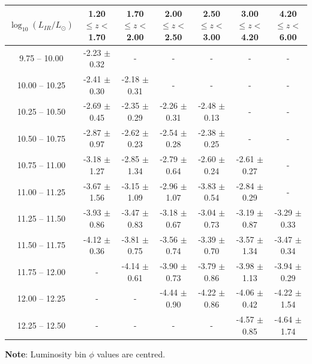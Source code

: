 \begin{table}
\begin{center}
\begin{tabular}{@{}ccccccc@{}}
        \hline
        $\log_{10}(L_{IR}/L_{\odot})$ & 1.20 $\leq z <$ 1.70 & 1.70 $\leq z <$ 2.00 & 2.00 $\leq z <$ 2.50 & 2.50 $\leq z <$ 3.00 & 3.00 $\leq z <$ 4.20 & 4.20 $\leq z <$ 6.00  \\
        \hline
         9.75 -- 10.00 & -2.23 $\pm$ 0.32 & -                & -                & -                & -                & - \\
        10.00 -- 10.25 & -2.41 $\pm$ 0.30 & -2.18 $\pm$ 0.31 & -                & -                & -                & - \\
        10.25 -- 10.50 & -2.69 $\pm$ 0.45 & -2.35 $\pm$ 0.29 & -2.26 $\pm$ 0.31 & -2.48 $\pm$ 0.13 & -                & - \\
        10.50 -- 10.75 & -2.87 $\pm$ 0.97 & -2.62 $\pm$ 0.23 & -2.54 $\pm$ 0.28 & -2.38 $\pm$ 0.25 & -                & - \\
        10.75 -- 11.00 & -3.18 $\pm$ 1.27 & -2.85 $\pm$ 1.34 & -2.79 $\pm$ 0.64 & -2.60 $\pm$ 0.24 & -2.61 $\pm$ 0.27 & - \\
        11.00 -- 11.25 & -3.67 $\pm$ 1.56 & -3.15 $\pm$ 1.09 & -2.96 $\pm$ 1.07 & -3.83 $\pm$ 0.54 & -2.84 $\pm$ 0.29 & - \\
        11.25 -- 11.50 & -3.93 $\pm$ 0.86 & -3.47 $\pm$ 0.83 & -3.18 $\pm$ 0.67 & -3.04 $\pm$ 0.73 & -3.19 $\pm$ 0.87 & -3.29 $\pm$ 0.33 \\
        11.50 -- 11.75 & -4.12 $\pm$ 0.36 & -3.81 $\pm$ 0.75 & -3.56 $\pm$ 0.74 & -3.39 $\pm$ 0.70 & -3.57 $\pm$ 1.34 & -3.47 $\pm$ 0.34 \\
        11.75 -- 12.00 & -                & -4.14 $\pm$ 0.61 & -3.90 $\pm$ 0.73 & -3.79 $\pm$ 0.86 & -3.98 $\pm$ 1.13 & -3.94 $\pm$ 0.29 \\
        12.00 -- 12.25 & -                & -                & -4.44 $\pm$ 0.90 & -4.22 $\pm$ 0.86 & -4.06 $\pm$ 0.42 & -4.22 $\pm$ 1.54 \\
        12.25 -- 12.50 & -                & -                & -                & -                & -4.57 $\pm$ 0.85 & -4.64 $\pm$ 1.74
        \botrule
    \end{tabular}
    \end{center}
    \begin{tabnote}
        {\textbf{Note}: Luminosity bin $\phi$ values are centred.}\tnp
    \end{tabnote}
\end{table}

